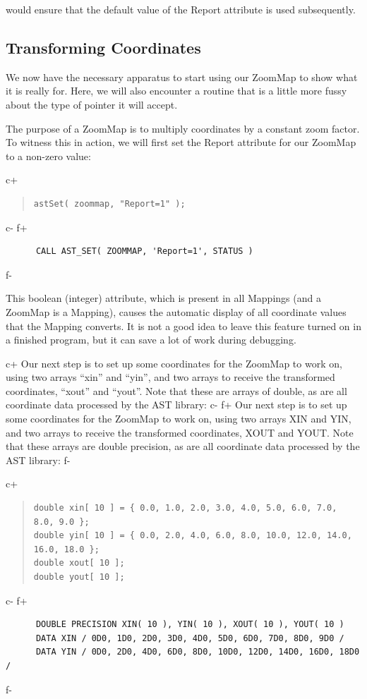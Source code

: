 \documentclass[twoside,11pt]{article}
\begin{document}
would ensure that the default value of the Report attribute is used
subsequently.


\subsection{\label{ss:transforming}Transforming Coordinates}

We now have the necessary apparatus to start using our ZoomMap to show
what it is really for. Here, we will also encounter a routine that is
a little more fussy about the type of pointer it will accept.

The purpose of a ZoomMap is to multiply coordinates by a constant zoom
factor. To witness this in action, we will first set the Report
attribute for our ZoomMap to a non-zero value:

c+
\begin{quote}
\small
\begin{verbatim}
astSet( zoommap, "Report=1" );
\end{verbatim}
\normalsize
\end{quote}
c-
f+
\small
\begin{verbatim}
      CALL AST_SET( ZOOMMAP, 'Report=1', STATUS )
\end{verbatim}
\normalsize
f-

This boolean (integer) attribute, which is present in all Mappings
(and a ZoomMap is a Mapping), causes the automatic display of all
coordinate values that the Mapping converts. It is not a good idea to
leave this feature turned on in a finished program, but it can save a
lot of work during debugging.

c+
Our next step is to set up some coordinates for the ZoomMap to work
on, using two arrays ``xin'' and ``yin'', and two arrays to receive
the transformed coordinates, ``xout'' and ``yout''.  Note that these
are arrays of double, as are all coordinate data processed by the AST
library:
c-
f+
Our next step is to set up some coordinates for the ZoomMap to work
on, using two arrays XIN and YIN, and two arrays to receive the
transformed coordinates, XOUT and YOUT.  Note that these arrays are
double precision, as are all coordinate data processed by the AST
library:
f-

c+
\begin{quote}
\small
\begin{verbatim}
double xin[ 10 ] = { 0.0, 1.0, 2.0, 3.0, 4.0, 5.0, 6.0, 7.0, 8.0, 9.0 };
double yin[ 10 ] = { 0.0, 2.0, 4.0, 6.0, 8.0, 10.0, 12.0, 14.0, 16.0, 18.0 };
double xout[ 10 ];
double yout[ 10 ];
\end{verbatim}
\normalsize
\end{quote}
c-
f+
\small
\begin{verbatim}
      DOUBLE PRECISION XIN( 10 ), YIN( 10 ), XOUT( 10 ), YOUT( 10 )
      DATA XIN / 0D0, 1D0, 2D0, 3D0, 4D0, 5D0, 6D0, 7D0, 8D0, 9D0 /
      DATA YIN / 0D0, 2D0, 4D0, 6D0, 8D0, 10D0, 12D0, 14D0, 16D0, 18D0 /
\end{verbatim}
\normalsize
f-
\end{document}
